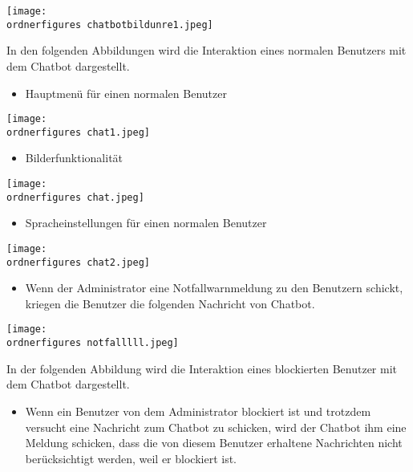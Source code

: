 \begin{center}
	\captionsetup{type=figure}
	\texttt{[image: \\ordnerfigures chatbotbildunre1.jpeg]}
	\caption{Spracheinstellungen f\"ur unregistrierte Benutzer}
	\label{fig:chatfd3}
\end{center}
In den folgenden Abbildungen wird die Interaktion eines normalen Benutzers mit dem Chatbot dargestellt.
\begin{itemize}
	\item Hauptmen\"u f\"ur einen normalen Benutzer
\end{itemize}
\begin{center}
	\captionsetup{type=figure}
	\texttt{[image: \\ordnerfigures chat1.jpeg]}
	\caption{Hauptmen\"ur f\"ur einen normalen Benutzer} 
	\label{fig:chgtfd3}
\end{center}
\newpage
\begin{itemize}
	\item Bilderfunktionalit\"at
\end{itemize}
\begin{center}
	\captionsetup{type=figure}
	\texttt{[image: \\ordnerfigures chat.jpeg]}
	\caption{Bilderfunktionalit\"at} 
	\label{fig:chgtf53}
\end{center}
\begin{itemize}
	\item Spracheinstellungen f\"ur einen normalen Benutzer
\end{itemize}
\begin{center}
	\captionsetup{type=figure}
	\texttt{[image: \\ordnerfigures chat2.jpeg]}
	\caption{Spracheinstellungen f\"ur einen normalen Benutzer} 
	\label{fig:chgtf43}
\end{center}
\begin{itemize}
	\item Wenn der Administrator eine Notfallwarnmeldung zu den Benutzern schickt, kriegen die Benutzer die folgenden Nachricht von Chatbot.
\end{itemize}
\begin{center}
	\captionsetup{type=figure}
	\texttt{[image: \\ordnerfigures notfalllll.jpeg]}
	\caption{Notfallwarmeldung vom Administrator} 
	\label{fig:chgf43}
\end{center}
In der folgenden Abbildung wird die Interaktion eines blockierten Benutzer mit dem Chatbot dargestellt.
\begin{itemize}
	\item Wenn ein Benutzer von dem Administrator blockiert ist und trotzdem versucht eine Nachricht zum Chatbot zu schicken, wird der Chatbot ihm eine Meldung schicken, dass die von diesem Benutzer erhaltene Nachrichten nicht ber\"ucksichtigt werden, weil er blockiert ist. 
\end{itemize}
